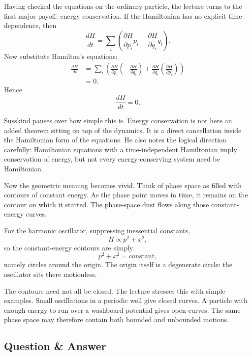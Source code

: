 Having checked the equations on the ordinary particle, the lecture turns to the first major payoff: energy conservation. If the Hamiltonian has no explicit time dependence, then
\begin{equation}
\frac{dH}{dt}
=
\sum_i
\left(
\frac{\partial H}{\partial p_i}\dot p_i
+
\frac{\partial H}{\partial q_i}\dot q_i
\right).
\end{equation}
Now substitute Hamilton's equations:
\begin{align}
\frac{dH}{dt}
&=
\sum_i
\left(
\frac{\partial H}{\partial p_i}
\left(-\frac{\partial H}{\partial q_i}\right)
+
\frac{\partial H}{\partial q_i}
\left(\frac{\partial H}{\partial p_i}\right)
\right) \\
&=0.
\end{align}
Hence
\begin{equation}
\frac{dH}{dt}=0.
\end{equation}

Susskind pauses over how simple this is. Energy conservation is not here an added theorem sitting on top of the dynamics. It is a direct cancellation inside the Hamiltonian form of the equations. He also notes the logical direction carefully: Hamiltonian equations with a time-independent Hamiltonian imply conservation of energy, but not every energy-conserving system need be Hamiltonian.

Now the geometric meaning becomes vivid. Think of phase space as filled with contours of constant energy. As the phase point moves in time, it remains on the contour on which it started. The phase-space dust flows along those constant-energy curves.

For the harmonic oscillator, suppressing inessential constants,
\begin{equation}
H \propto p^2+x^2,
\end{equation}
so the constant-energy contours are simply
\begin{equation}
p^2+x^2=\text{constant},
\end{equation}
namely circles around the origin. The origin itself is a degenerate circle: the oscillator sits there motionless.

The contours need not all be closed. The lecture stresses this with simple examples. Small oscillations in a periodic well give closed curves. A particle with enough energy to run over a washboard potential gives open curves. The same phase space may therefore contain both bounded and unbounded motions.

\subsection{Question \& Answer}


